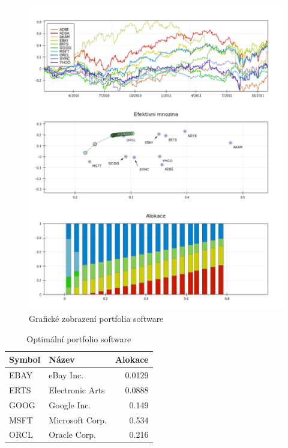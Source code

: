\documentclass[12pt,a4paper]{report}
\begin{document}
    \begin{figure}[htb]
      \centering
        \includegraphics[height=0.90\textheight]{sw1.png}
       \caption{Grafické zobrazení portfolia software}
    \end{figure}

    \begin{table}[htb]
      \centering
      \begin{tabular}{|l|l|r|}
        \hline
        Symbol&Název&Alokace\\\hline\hline
        EBAY&eBay Inc. &0.0129\\\hline
        ERTS&Electronic Arts &0.0888\\\hline
        GOOG&Google Inc. &0.149\\\hline
        MSFT&Microsoft Corp. &0.534\\\hline
        ORCL&Oracle Corp. &0.216\\\hline
      \end{tabular}
      \caption{Optimální portfolio software}
    \end{table}

  \clearpage
\end{document}
